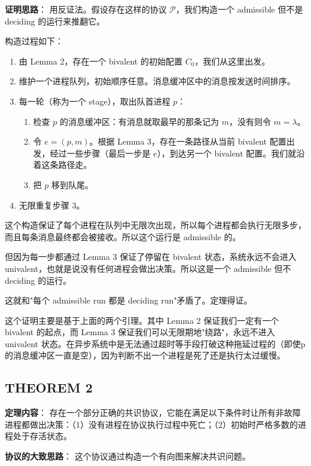 \documentclass[12pt, a4paper]{ctexart}
\theoremstyle{definition}
\theoremstyle{plain}
\theoremstyle{remark}
\begin{document}
\textbf{证明思路}：
用反证法。假设存在这样的协议 $\mathcal{P}$，我们构造一个 admissible 但不是 deciding 的运行来推翻它。

构造过程如下：

\begin{enumerate}
    \item 由 Lemma 2，存在一个 bivalent 的初始配置 $C_0$，我们从这里出发。
    \item 维护一个进程队列，初始顺序任意。消息缓冲区中的消息按发送时间排序。
    \item 每一轮（称为一个 stage），取出队首进程 $p$：
    \begin{enumerate}
        \item 检查 $p$ 的消息缓冲区：有消息就取最早的那条记为 $m$，没有则令 $m = \lambda$。
        \item 令 $e = (p, m)$。根据 Lemma 3，存在一条路径从当前 bivalent 配置出发，经过一些步骤（最后一步是 $e$），到达另一个 bivalent 配置。我们就沿着这条路径走。
        \item 把 $p$ 移到队尾。
    \end{enumerate}
    \item 无限重复步骤 3。
\end{enumerate}

这个构造保证了每个进程在队列中无限次出现，所以每个进程都会执行无限多步，而且每条消息最终都会被接收。所以这个运行是 admissible 的。

但因为每一步都通过 Lemma 3 保证了停留在 bivalent 状态，系统永远不会进入 univalent，也就是说没有任何进程会做出决策。所以这是一个 admissible 但不 deciding 的运行。

这就和"每个 admissible run 都是 deciding run"矛盾了。定理得证。

这个证明主要是基于上面的两个引理。其中 Lemma 2 保证我们一定有一个 bivalent 的起点，而 Lemma 3 保证我们可以无限期地"绕路"，永远不进入 univalent 状态。在异步系统中是无法通过超时等手段打破这种拖延过程的（即使p的消息缓冲区一直是空），因为判断不出一个进程是死了还是执行太过缓慢。


\subsection{THEOREM 2}

\textbf{定理内容}：
存在一个部分正确的共识协议，它能在满足以下条件时让所有非故障进程都做出决策：（1）没有进程在协议执行过程中死亡；（2）初始时严格多数的进程处于存活状态。

\textbf{协议的大致思路}：
这个协议通过构造一个有向图来解决共识问题。
\end{document}
